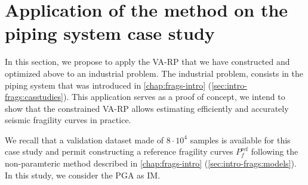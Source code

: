 \section{Application of the method on the piping system case study}\label{sec:constr-frags:appasg}


In this section, we propose to apply the VA-RP that we have constructed and optimized above
to an industrial problem.
The industrial problem,  consists in the piping system that was introduced in   \cref{chap:frags-intro} (\cref{sec:intro-frags:casstudies}). 
This application serves as a proof of concept, we intend to show that the constrained VA-RP allows estimating efficiently and accurately seismic fragility curves in practice.

We recall that a validation dataset made of $8\cdot 10^4$ samples is available for this case study and permit constructing a reference fragility curves $P_f^{\text{ref}}$ following the non-paramteric method described in \cref{chap:frags-intro} (\cref{sec:intro-frags:models}).
In this study, we consider the PGA as IM.













